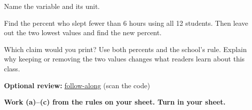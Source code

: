 \documentclass[14pt]{extarticle}
\begin{document}
\begin{description}[leftmargin=1.15in, labelwidth=1in, itemsep=2pt, topsep=2pt]
  \item[\dokbadge{1}~(a)] Name the variable and its unit.
  \item[\dokbadge{2}~(b)] Find the percent who slept fewer than 6 hours using all 12 students. Then leave out the two lowest values and find the new percent.
  \item[\dokbadge{3}~(c)] Which claim would you print? Use both percents and the school's rule. Explain why keeping or removing the two values changes what readers learn about this class.
\end{description}

\vfill
\noindent\begin{minipage}{0.84\linewidth}
\textbf{Optional review:} \href{https://robjohncolson.github.io/apstats-live-worksheet/u1_lesson1_live.html}{follow-along} (scan the code)\par
\textbf{Work (a)--(c) from the rules on your sheet. Turn in your sheet.}
\end{minipage}\hfill
{}
\end{document}
